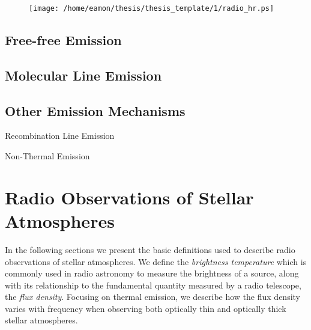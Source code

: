 \begin{figure}[hbt!]
\centering 
          \texttt{[image: /home/eamon/thesis/thesis\_template/1/radio\_hr.ps]}
\caption[]{}
\label{fig:1.5.3}
\end{figure}
\subsection{Free-free Emission}\label{sec:1.4.1}
\subsection{Molecular Line Emission}\label{sec:1.4.2}
\subsection{Other Emission Mechanisms}\label{sec:1.4.2}
Recombination Line Emission

Non-Thermal Emission
\section{Radio Observations of Stellar Atmospheres}
In the following sections we present the basic definitions used to describe radio observations of stellar atmospheres. We define the \textit{brightness temperature} which is commonly used in radio astronomy to measure the brightness of a source, along with its relationship to the fundamental quantity measured by a radio telescope, the \textit{flux density}. Focusing on thermal emission, we describe how the flux density varies with frequency when observing both optically thin and optically thick stellar atmospheres.

